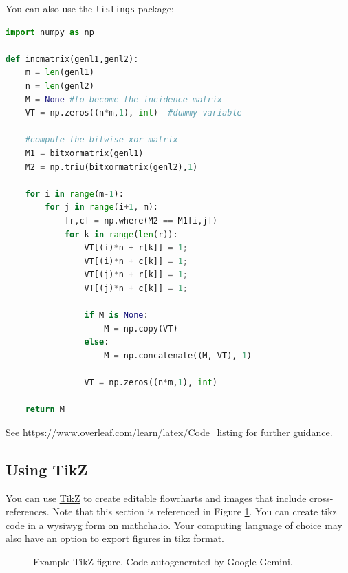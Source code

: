 \documentclass{article}
\begin{document}
You can also use the \texttt{listings} package:
\begin{lstlisting}[language=Python, caption=Python example]
import numpy as np
    
def incmatrix(genl1,genl2):
    m = len(genl1)
    n = len(genl2)
    M = None #to become the incidence matrix
    VT = np.zeros((n*m,1), int)  #dummy variable
    
    #compute the bitwise xor matrix
    M1 = bitxormatrix(genl1)
    M2 = np.triu(bitxormatrix(genl2),1) 

    for i in range(m-1):
        for j in range(i+1, m):
            [r,c] = np.where(M2 == M1[i,j])
            for k in range(len(r)):
                VT[(i)*n + r[k]] = 1;
                VT[(i)*n + c[k]] = 1;
                VT[(j)*n + r[k]] = 1;
                VT[(j)*n + c[k]] = 1;
                
                if M is None:
                    M = np.copy(VT)
                else:
                    M = np.concatenate((M, VT), 1)
                
                VT = np.zeros((n*m,1), int)
    
    return M
\end{lstlisting}

See \url{https://www.overleaf.com/learn/latex/Code_listing} for further guidance.


\subsection{Using TikZ}
\label{sec:tikz}
You can use \href{https://texample.net//tikz/examples/}{TikZ} to create editable flowcharts and images that include cross-references. Note that this section is referenced in Figure \ref{fig:tikz1}. You can create tikz code in a \acrshort{wysiwyg} form on \url{mathcha.io}. Your computing language of choice may also have an option to export figures in tikz format. 

\begin{figure}
    \centering


    \caption{Example TikZ figure. Code autogenerated by Google Gemini.}
    \label{fig:tikz1}
\end{figure}
\end{document}
